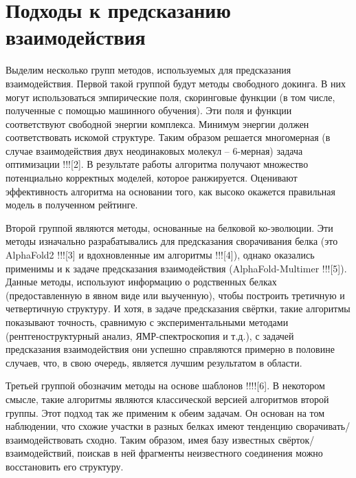 \section{Подходы к предсказанию взаимодействия}
Выделим несколько групп методов, используемых для предсказания взаимодействия. Первой такой группой будут методы свободного докинга. В них могут использоваться эмпирические поля, скоринговые функции (в том числе, полученные с помощью машинного обучения). Эти поля и функции соответствуют свободной энергии комплекса. Минимум энергии должен соответствовать искомой структуре. Таким образом решается многомерная (в случае взаимодействия двух неодинаковых молекул – 6-мерная) задача оптимизации !!![2]. В результате работы алгоритма получают множество потенциально корректных моделей, которое ранжируется. Оценивают эффективность алгоритма на основании того, как высоко окажется правильная модель в полученном рейтинге.

Второй группой являются методы, основанные на белковой ко-эволюции. Эти методы изначально разрабатывались для предсказания сворачивания белка  (это AlphaFold2 !!![3] и вдохновленные им алгоритмы !!![4]), однако оказались применимы и к задаче предсказания взаимодействия (AlphaFold-Multimer !!![5]). Данные методы, используют информацию о родственных белках (предоставленную в явном виде или выученную), чтобы построить третичную и четвертичную структуру. И хотя, в задаче предсказания свёртки, такие алгоритмы показывают точность, сравнимую с экспериментальными методами (рентгеноструктурный анализ, ЯМР-спектроскопия и т.д.), с задачей предсказания взаимодействия они успешно справляются примерно в половине случаев, что, в свою очередь, является лучшим результатом в области.

Третьей группой обозначим методы на основе шаблонов !!!![6]. В некотором смысле, такие алгоритмы являются классической версией алгоритмов второй группы. Этот подход так же применим к обеим задачам. Он основан на том наблюдении, что схожие участки в разных белках имеют тенденцию сворачивать/взаимодействовать сходно. Таким образом, имея базу известных свёрток/взаимодействий, поискав в ней фрагменты неизвестного соединения можно восстановить его структуру.

